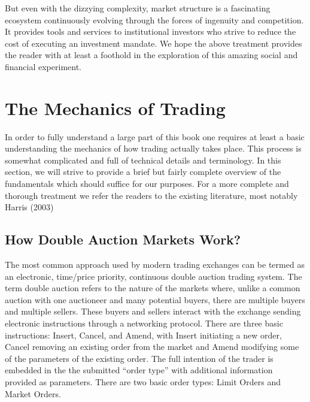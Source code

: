 But even with the dizzying complexity, market structure is a fascinating ecosystem continuously evolving through the forces of ingenuity and competition. It provides tools and services to institutional investors who strive to reduce the cost of executing an investment mandate. We hope the above treatment provides the reader with at least a foothold in the exploration of this amazing social and financial experiment.



\section{The Mechanics of Trading}

In order to fully understand a large part of this book one requires at least a basic understanding the mechanics of how trading actually takes place. This process is somewhat complicated and full of technical details and terminology. In this section, we will strive to provide a brief but fairly complete overview of the fundamentals which should suffice for our purposes. For a more complete and thorough treatment we refer the readers to the existing literature, most notably Harris (2003)~\cite{harris03trade}


\subsection{How Double Auction Markets Work?}


The most common approach used by modern trading exchanges can be termed as an electronic, time/price priority, continuous double auction trading system. The term double auction refers to the nature of the markets where, unlike a common auction with one auctioneer and many potential buyers, there are multiple buyers and multiple sellers. These buyers and sellers interact with the exchange sending electronic instructions through a networking protocol. There are three basic instructions: Insert, Cancel, and Amend, with Insert initiating a new order, Cancel removing an existing order from the market and Amend modifying some of the parameters of the existing order. The full intention of the trader is embedded in the the submitted ``order type'' with additional information provided as parameters. There are two basic order types: Limit Orders and Market Orders.


